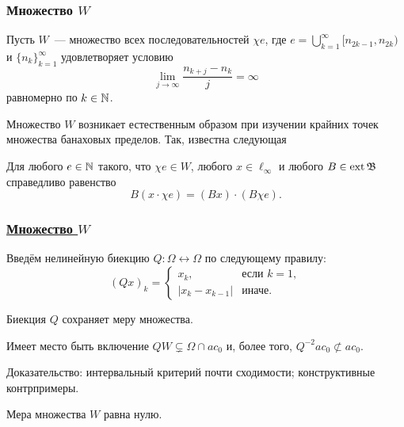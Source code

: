 \begin{frame}\frametitle{Множество $W$}


	Пусть $W$~--- множество всех последовательностей $\chi e$, где $e =\bigcup_{k=1}^{\infty} [n_{2k-1}, n_{2k} )$
	и $\{n_k \}_{k=1}^{\infty}$
	удовлетворяет условию
	\begin{equation}
		\label{eq:lim_j_n_kj_measure}
		\lim_{j\to\infty}\frac{n_{k+j} - n_k}{j} = \infty
	\end{equation}
	равномерно по $k \in \mathbb{N}$.

	Множество $W$ возникает естественным образом при изучении крайних точек множества банаховых пределов.
	Так, известна следующая
	\begin{llemma}
		Для любого $e\in\mathbb{N}$ такого, что $\chi e \in W$,
		любого $x\in\ell_\infty$
		и любого $B\in\operatorname{ext}\mathfrak{B}$
		справедливо равенство
		\begin{equation}
			B(x \cdot \chi e) = (Bx) \cdot (B\chi e)
			.
		\end{equation}
	\end{llemma}
\end{frame}




\begin{frame}\frametitle{\underline{Множество $W$}}
	Введём нелинейную биекцию $Q:\Omega\leftrightarrow\Omega$ по следующему правилу:
	\begin{equation}
		(Qx)_k = \begin{cases}
			x_k, &\mbox{если~} k = 1,
			\\
			|x_k-x_{k-1}|&\mbox{иначе}.
		\end{cases}
	\end{equation}

	\begin{llemma}
		Биекция $Q$ сохраняет меру множества.
	\end{llemma}

	\begin{llemma}
		Имеет место быть включение $QW\subsetneq \Omega\cap ac_0$ и,
		более того,
		$Q^{-2} ac_0 \not \subset ac_0$.
	\end{llemma}

	Доказательство: интервальный критерий почти сходимости;
	конструктивные контрпримеры.


	\begin{ttheorem}
		Мера множества $W$ равна нулю.
	\end{ttheorem}


\end{frame}





